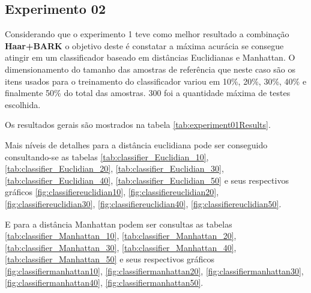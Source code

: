 \begin{myenv}{1.5}
		\newpage
		\section{Experimento 02}
			\par Considerando que o experimento 1 teve como melhor resultado a combinação \textbf{Haar+BARK} o objetivo deste é constatar a máxima acurácia se consegue atingir em um classificador baseado em distâncias Euclidianas e Manhattan. O dimensionamento do tamanho das amostras de referência que neste caso são os itens usados para o treinamento do classificador variou em 10\%, 20\%, 30\%, 40\% e finalmente 50\% do total das amostras. 300 foi a quantidade máxima de testes escolhida.
			\par Os resultados gerais são mostrados na tabela \ref{tab:experiment01Results}. 
			
			\par Mais níveis de detalhes para a distância euclidiana pode ser conseguido consultando-se as tabelas \ref{tab:classifier_Euclidian_10}, \ref{tab:classifier_Euclidian_20}, \ref{tab:classifier_Euclidian_30}, \ref{tab:classifier_Euclidian_40},  \ref{tab:classifier_Euclidian_50} e seus respectivos gráficos \ref{fig:classifiereuclidian10}, \ref{fig:classifiereuclidian20}, \ref{fig:classifiereuclidian30}, \ref{fig:classifiereuclidian40}, \ref{fig:classifiereuclidian50}.
			
			\par E para a distância Manhattan podem ser consultas as tabelas 	\ref{tab:classifier_Manhattan_10}, \ref{tab:classifier_Manhattan_20}, \ref{tab:classifier_Manhattan_30}, \ref{tab:classifier_Manhattan_40}, \ref{tab:classifier_Manhattan_50} e seus respectivos gráficos 		 
			 \ref{fig:classifiermanhattan10}, \ref{fig:classifiermanhattan20}, 	 \ref{fig:classifiermanhattan30}, \ref{fig:classifiermanhattan40},  \ref{fig:classifiermanhattan50}.
			
			

\end{myenv}
